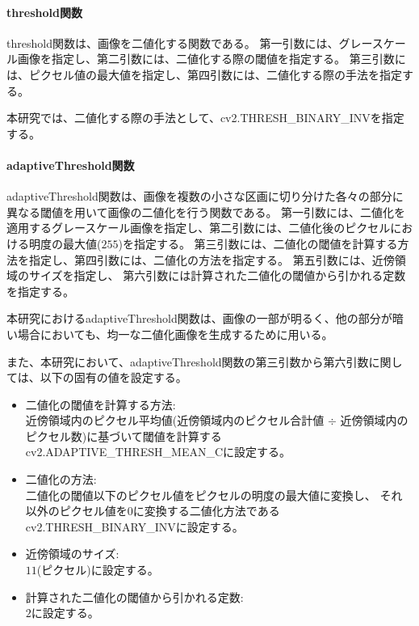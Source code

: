 \paragraph{threshold関数}
threshold関数は、画像を二値化する関数である。
第一引数には、グレースケール画像を指定し、第二引数には、二値化する際の閾値を指定する。
第三引数には、ピクセル値の最大値を指定し、第四引数には、二値化する際の手法を指定する。
\par
本研究では、二値化する際の手法として、cv2.THRESH\_BINARY\_INV\cite{Threshold}を指定する。
\paragraph{adaptiveThreshold関数}
adaptiveThreshold関数は、画像を複数の小さな区画に切り分けた各々の部分に異なる閾値を用いて画像の二値化を行う関数である。
第一引数には、二値化を適用するグレースケール画像を指定し、第二引数には、二値化後のピクセルにおける明度の最大値($255$)を指定する。
第三引数には、二値化の閾値を計算する方法を指定し、第四引数には、二値化の方法を指定する。
第五引数には、近傍領域のサイズを指定し、
第六引数には計算された二値化の閾値から引かれる定数を指定する。
\par
本研究におけるadaptiveThreshold関数は、画像の一部が明るく、他の部分が暗い場合においても、均一な二値化画像を生成するために用いる。
\par
また、本研究において、adaptiveThreshold関数の第三引数から第六引数に関しては、以下の固有の値を設定する。
\begin{itemize}
      \setlength{\itemsep}{0pt}
            \setlength{\parsep}{0pt}
      \item 二値化の閾値を計算する方法:\\
            近傍領域内のピクセル平均値(近傍領域内のピクセル合計値 $\div$ 近傍領域内のピクセル数)に基づいて閾値を計算するcv2.ADAPTIVE\_THRESH\_MEAN\_C\cite{AdaptiveThreshold}に設定する。
      \item 二値化の方法:\\
            二値化の閾値以下のピクセル値をピクセルの明度の最大値に変換し、
            それ以外のピクセル値を$0$に変換する二値化方法であるcv2.THRESH\_BINARY\_INV\cite{Threshold}に設定する。
      \item 近傍領域のサイズ:\\
            $11$(ピクセル)に設定する。
      \item 計算された二値化の閾値から引かれる定数:\\
            $2$に設定する。
\end{itemize}
